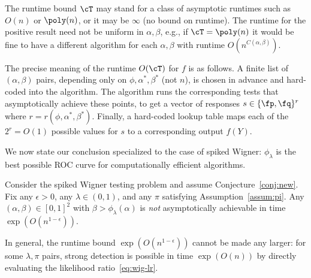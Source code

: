 \documentclass[11pt]{article}
\begin{document}
\begin{remark}[Runtime]
The runtime bound $\cT$ may stand for a class of asymptotic runtimes such as $O(n)$ or $\poly(n)$, or it may be $\infty$ (no bound on runtime). The runtime for the positive result need not be uniform in $\alpha,\beta$, e.g., if $\cT = \poly(n)$ it would be fine to have a different algorithm for each $\alpha,\beta$ with runtime $O(n^{C(\alpha,\beta)})$.

The precise meaning of the runtime $O(\cT)$ for $f$ is as follows. A finite list of $(\alpha,\beta)$ pairs, depending only on $\phi,\alpha^*,\beta^*$ (not $n$), is chosen in advance and hard-coded into the algorithm. The algorithm runs the corresponding tests that asymptotically achieve these points, to get a vector of responses $s \in \{\fp,\fq\}^r$ where $r = r(\phi,\alpha^*,\beta^*)$. Finally, a hard-coded lookup table maps each of the $2^r = O(1)$ possible values for $s$ to a corresponding output $f(Y)$.
\end{remark}

\noindent We now state our conclusion specialized to the case of spiked Wigner: $\phi_\lambda$ is the best possible ROC curve for computationally efficient algorithms.

\begin{corollary}\label{cor:main-comp}
Consider the spiked Wigner testing problem and assume Conjecture~\ref{conj:new}. Fix any $\epsilon > 0$, any $\lambda \in (0,1)$, and any $\pi$ satisfying Assumption~\ref{assum:pi}. Any $(\alpha,\beta) \in [0,1]^2$ with $\beta > \phi_\lambda(\alpha)$ is \emph{not} asymptotically achievable in time $\exp(O(n^{1-\epsilon}))$.
\end{corollary}

\noindent In general, the runtime bound $\exp(O(n^{1-\epsilon}))$ cannot be made any larger: for some $\lambda,\pi$ pairs, strong detection is possible in time $\exp(O(n))$ by directly evaluating the likelihood ratio~\eqref{eq:wig-lr}.
\end{document}
